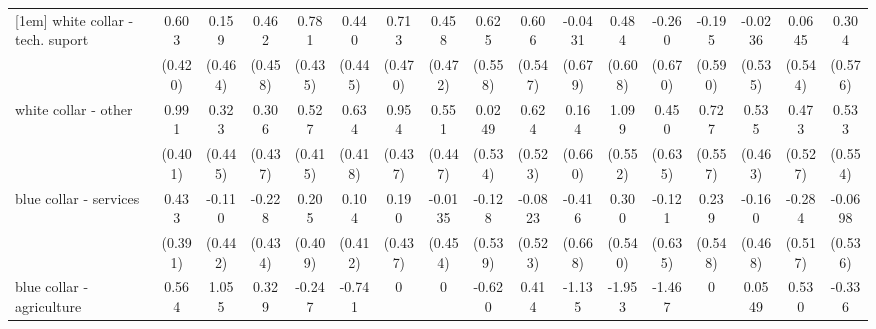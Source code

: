 {\begin{tabular}{l*{16}{c}}
[1em]
white collar - tech. suport&       0.603         &       0.159         &       0.462         &       0.781         &       0.440         &       0.713         &       0.458         &       0.625         &       0.606         &     -0.0431         &       0.484         &      -0.260         &      -0.195         &     -0.0236         &      0.0645         &       0.304         \\
                    &     (0.420)         &     (0.464)         &     (0.458)         &     (0.435)         &     (0.445)         &     (0.470)         &     (0.472)         &     (0.558)         &     (0.547)         &     (0.679)         &     (0.608)         &     (0.670)         &     (0.590)         &     (0.535)         &     (0.544)         &     (0.576)         \\
[1em]
white collar - other&       0.991\sym{*}  &       0.323         &       0.306         &       0.527         &       0.634         &       0.954\sym{*}  &       0.551         &      0.0249         &       0.624         &       0.164         &       1.099\sym{*}  &       0.450         &       0.727         &       0.535         &       0.473         &       0.533         \\
                    &     (0.401)         &     (0.445)         &     (0.437)         &     (0.415)         &     (0.418)         &     (0.437)         &     (0.447)         &     (0.534)         &     (0.523)         &     (0.660)         &     (0.552)         &     (0.635)         &     (0.557)         &     (0.463)         &     (0.527)         &     (0.554)         \\
[1em]
blue collar - services&       0.433         &      -0.110         &      -0.228         &       0.205         &       0.104         &       0.190         &     -0.0135         &      -0.128         &     -0.0823         &      -0.416         &       0.300         &      -0.121         &       0.239         &      -0.160         &      -0.284         &     -0.0698         \\
                    &     (0.391)         &     (0.442)         &     (0.434)         &     (0.409)         &     (0.412)         &     (0.437)         &     (0.454)         &     (0.539)         &     (0.523)         &     (0.668)         &     (0.540)         &     (0.635)         &     (0.548)         &     (0.468)         &     (0.517)         &     (0.536)         \\
[1em]
blue collar - agriculture&       0.564         &       1.055         &       0.329         &      -0.247         &      -0.741         &           0         &           0         &      -0.620         &       0.414         &      -1.135         &      -1.953         &      -1.467         &           0         &      0.0549         &       0.530         &      -0.336         \\

\end{tabular}}
